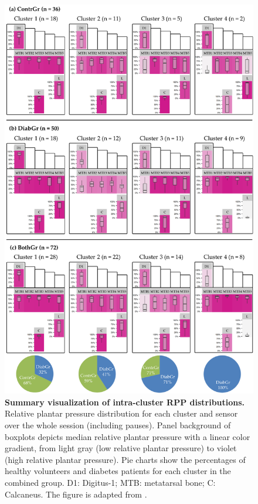 \documentclass[
  oneside]{book}
\begin{document}
\begin{figure}[htb]

{\centering \includegraphics[width=1\linewidth]{figures/07-pone-clusters} 

}

\caption{\textbf{Summary visualization of intra-cluster RPP distributions.} Relative plantar pressure distribution for each cluster and sensor over the whole session (including pauses). Panel background of boxplots depicts median relative plantar pressure with a linear color gradient, from light gray (low relative plantar pressure) to violet (high relative plantar pressure). Pie charts show the percentages of healthy volunteers and diabetes patients for each cluster in the combined group. D1: Digitus-1; MTB: metatarsal bone; C: Calcaneus. The figure is adapted from \autocite{Niemann:PONE2016}.}\label{fig:07-pone-clusters}
\end{figure}
\end{document}
